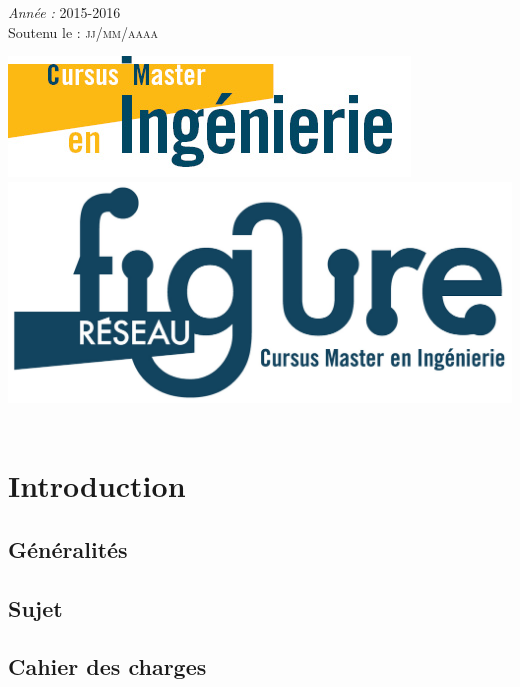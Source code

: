 \documentclass[12pt]{report}
\begin{document}
\begin{titlepage}
\begin{sffamily}
\begin{center}
\begin{minipage}{0.4\textwidth}
\begin{flushleft}
					\end{flushleft}
				\end{minipage}
				\begin{minipage}{0.4\textwidth}
					\begin{flushright} \large
						\emph{Année :} \textsc{2015-2016}\\
						Soutenu le : \textsc{jj/mm/aaaa}
					\end{flushright}
				\end{minipage}

		
				\includegraphics[scale=0.5]{logo_CMI.jpg}~
				\includegraphics[scale=0.5]{logo_figure.jpg}~
				
				
				\vfill
				
				
			\end{center}
		\end{sffamily}
	\end{titlepage}
	\renewcommand{\contentsname}{Sommaire}	
	\tableofcontents
	
	\chapter{Introduction}
		\section{Généralités}
		\section{Sujet}
		\section{Cahier des charges}
\end{document}
